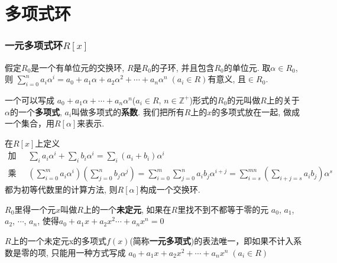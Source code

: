 \chapter{多项式环}

\subsection{一元多项式环$R[x]$} %
\begin{Note}
假定$R_0$是一个有单位元的交换环, $R$是$R_0$的子环, 并且包含$R_0$的单位元. 取$\alpha \in R_0$, 则
$ \displaystyle \sum_{i=0}^n a_i \alpha^i = a_0 + a_1 \alpha + a_2 \alpha^2 + \cdots + a_n \alpha^n\; (a_i \in R) $有意义, 且$\in R_0$.
\end{Note}

\begin{Definition}[多项式]
一个可以写成 $ a_0 + a_1 \alpha + \cdots + a_n \alpha^n $($a_i \in R$, $n \in \mathbb{Z}^+ $)形式的$R_0$的元叫做$R$上的关于$\alpha$的一个\textbf{多项式}, $a_i$叫做多项式的\textbf{系数}. 我们把所有$R$上的$x$的多项式放在一起, 做成一个集合，用$R[\alpha]$来表示.
\end{Definition}

\begin{Note}[环上的多项式构成一个环]
在$R[x]$上定义
$$
\begin{aligned}
\text{加法: }& \sum\limits_i a_i \alpha^i + \sum\limits_i b_i \alpha^i = \sum\limits_i (a_i + b_i) \alpha^i \\
\text{乘法: }& \displaystyle \left(\sum_{i=0}^m a_i \alpha^i \right) \left( \sum_{j=0}^{n} b_j \alpha^j \right) 
= \sum\limits_{i=0}^m \sum\limits_{j=0}^{n} a_i b_j \alpha^{i+j}
= \sum_{i=s}^{mn} \left(\sum_{i+j=s} a_i b_{j} \right) \alpha^s
\end{aligned}
$$
 都为初等代数里的计算方法, 则$R[\alpha]$构成一个交换环.
\end{Note}

\begin{Definition}[未定元]
$R_0$里得一个元$x$叫做$R$上的一个\textbf{未定元}, 如果在$R$里找不到不都等于零的元
$a_0$, $a_1$, $a_2$, $\cdots$, $a_n$, 使得$a_0 + a_1 x + a_2 x^2 \cdots + a_n x^n = 0$
\end{Definition}

\begin{Proposition}[!]
$R$上的一个未定元x的多项式$f(x)$(简称\textbf{一元多项式})的表法唯一，即如果不计入系数是零的项, 只能用一种方式写成
$a_0 + a_1 x + a_2 x^2 + \cdots + a_n x^n \; (a_i \in R)$
\end{Proposition}

